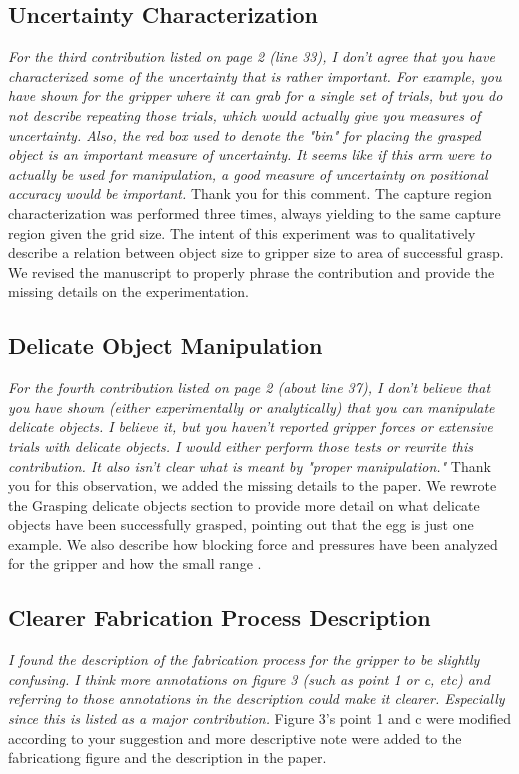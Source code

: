 \documentclass[letterpaper, 10 pt, twocolumn, conference]{article}
\begin{document}
\subsection{Uncertainty Characterization}
\textit{For the third contribution listed on page 2 (line 33), I don't agree that you have characterized some of the uncertainty that is rather important. For example, you have shown for the gripper where it can grab for a single set of trials, but you do not describe repeating those trials, which would actually give you measures of uncertainty. Also, the red box used to denote the "bin" for placing the grasped object is an important measure of uncertainty. It seems like if this arm were to actually be used for manipulation, a good measure of uncertainty on positional accuracy would be important.}
%
Thank you for this comment. The capture region characterization was performed three times, always yielding to the same capture region given the grid size. The intent of this experiment was to qualitatively describe a relation between object size to gripper size to area of successful grasp. 
We revised the manuscript to properly phrase the contribution and provide the missing details on the experimentation.
%
\subsection{Delicate Object Manipulation}
\textit{For the fourth contribution listed on page 2 (about line 37), I don't believe that you have shown (either experimentally or analytically) that you can manipulate delicate objects. I believe it, but you haven't reported gripper forces or extensive trials with delicate objects. I would either perform those tests or rewrite this contribution. It also isn't clear what is meant by "proper manipulation."}
%
Thank you for this observation, we added the missing details to the paper. We rewrote the Grasping delicate objects section to provide more detail on what delicate objects have been successfully grasped, pointing out that the egg is just one example. We also describe how blocking force and pressures have been analyzed for the gripper and how the small range .
%
\subsection{Clearer Fabrication Process Description}
\textit{I found the description of the fabrication process for the gripper to be slightly confusing. I think more annotations on figure 3 (such as point 1 or c, etc) and referring to those annotations in the description could make it clearer. Especially since this is listed as a major contribution.}
%
Figure 3’s point 1 and c were modified according to your suggestion and more descriptive note were added to the fabricationg figure and the description in the paper.
%
\end{document}
